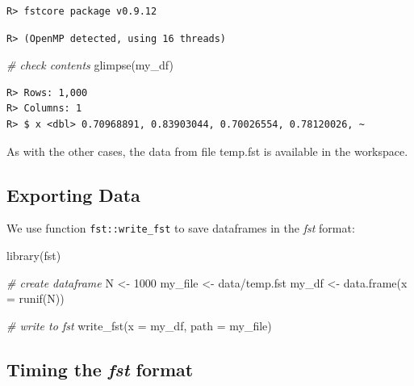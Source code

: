 \documentclass[
  12pt,
]{book}
\newenvironment{Shaded}{\begin{snugshade}}{\end{snugshade}}
\newcommand{\AttributeTok}[1]{\textcolor[rgb]{0.61,0.61,0.61}{#1}}
\newcommand{\CommentTok}[1]{\textcolor[rgb]{0.37,0.37,0.37}{\textit{#1}}}
\newcommand{\DecValTok}[1]{\textcolor[rgb]{0.06,0.06,0.06}{#1}}
\newcommand{\FunctionTok}[1]{\textcolor[rgb]{0,0,0}{#1}}
\newcommand{\NormalTok}[1]{#1}
\newcommand{\OtherTok}[1]{\textcolor[rgb]{0.37,0.37,0.37}{#1}}
\newcommand{\StringTok}[1]{\textcolor[rgb]{0.5,0.5,0.5}{#1}}
\begin{document}
\begin{verbatim}
R> fstcore package v0.9.12
\end{verbatim}

\begin{verbatim}
R> (OpenMP detected, using 16 threads)
\end{verbatim}

\begin{Shaded}
\begin{Highlighting}[]
\CommentTok{\# check contents}
\FunctionTok{glimpse}\NormalTok{(my\_df)}
\end{Highlighting}
\end{Shaded}

\begin{verbatim}
R> Rows: 1,000
R> Columns: 1
R> $ x <dbl> 0.70968891, 0.83903044, 0.70026554, 0.78120026, ~
\end{verbatim}

As with the other cases, the data from file temp.fst is available in the workspace. 

\hypertarget{exporting-data-3}{%
\subsection{Exporting Data}\label{exporting-data-3}}

We use function \texttt{fst::write\_fst} to save dataframes in the \emph{fst} format: 

\begin{Shaded}
\begin{Highlighting}[]
\FunctionTok{library}\NormalTok{(fst)}

\CommentTok{\# create dataframe}
\NormalTok{N }\OtherTok{\textless{}{-}} \DecValTok{1000}
\NormalTok{my\_file }\OtherTok{\textless{}{-}} \StringTok{\textquotesingle{}data/temp.fst\textquotesingle{}}
\NormalTok{my\_df }\OtherTok{\textless{}{-}} \FunctionTok{data.frame}\NormalTok{(}\AttributeTok{x =} \FunctionTok{runif}\NormalTok{(N))}

\CommentTok{\# write to fst}
\FunctionTok{write\_fst}\NormalTok{(}\AttributeTok{x =}\NormalTok{ my\_df, }\AttributeTok{path =}\NormalTok{ my\_file)}
\end{Highlighting}
\end{Shaded}

\hypertarget{timing-the-fst-format}{%
\subsection{\texorpdfstring{Timing the \emph{fst} format}{Timing the fst format}}\label{timing-the-fst-format}}
\end{document}
